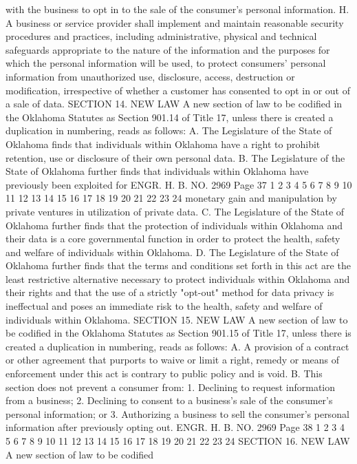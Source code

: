with the business to opt in to the sale of the consumer's personal
information.
H. A business or service provider shall implement and maintain
reasonable security procedures and practices, including
administrative, physical and technical safeguards appropriate to the
nature of the information and the purposes for which the personal
information will be used, to protect consumers' personal information
from unauthorized use, disclosure, access, destruction or
modification, irrespective of whether a customer has consented to
opt in or out of a sale of data.
SECTION 14. NEW LAW A new section of law to be codified
in the Oklahoma Statutes as Section 901.14 of Title 17, unless there
is created a duplication in numbering, reads as follows:
A. The Legislature of the State of Oklahoma finds that
individuals within Oklahoma have a right to prohibit retention, use
or disclosure of their own personal data.
B. The Legislature of the State of Oklahoma further finds that
individuals within Oklahoma have previously been exploited for 
ENGR. H. B. NO. 2969 Page 37
1
2
3
4
5
6
7
8
9
10
11
12
13
14
15
16
17
18
19
20
21
22
23
24
monetary gain and manipulation by private ventures in utilization of
private data.
C. The Legislature of the State of Oklahoma further finds that
the protection of individuals within Oklahoma and their data is a
core governmental function in order to protect the health, safety
and welfare of individuals within Oklahoma.
D. The Legislature of the State of Oklahoma further finds that
the terms and conditions set forth in this act are the least
restrictive alternative necessary to protect individuals within
Oklahoma and their rights and that the use of a strictly "opt-out"
method for data privacy is ineffectual and poses an immediate risk
to the health, safety and welfare of individuals within Oklahoma.
SECTION 15. NEW LAW A new section of law to be codified
in the Oklahoma Statutes as Section 901.15 of Title 17, unless there
is created a duplication in numbering, reads as follows:
A. A provision of a contract or other agreement that purports
to waive or limit a right, remedy or means of enforcement under this
act is contrary to public policy and is void.
B. This section does not prevent a consumer from:
1. Declining to request information from a business;
2. Declining to consent to a business's sale of the consumer's
personal information; or
3. Authorizing a business to sell the consumer's personal
information after previously opting out.
ENGR. H. B. NO. 2969 Page 38
1
2
3
4
5
6
7
8
9
10
11
12
13
14
15
16
17
18
19
20
21
22
23
24
SECTION 16. NEW LAW A new section of law to be codified
